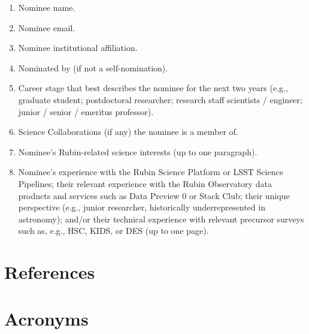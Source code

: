 \documentclass[OPS,toc]{lsstdoc}
\begin{document}
\begin{enumerate}
\item Nominee name.
\item Nominee email.
\item Nominee institutional affiliation.
\item Nominated by (if not a self-nomination).
\item Career stage that best describes the nominee for the next two years (e.g., graduate student; postdoctoral researcher; research staff scientists / engineer; junior / senior / emeritus professor).
\item Science Collaborations (if any) the nominee is a member of.
\item Nominee’s Rubin-related science interests (up to one paragraph).
\item Nominee’s experience with the Rubin Science Platform or LSST Science Pipelines; their relevant experience with the Rubin Observatory data products and services such as Data Preview 0 or Stack Club; their unique perspective (e.g., junior researcher, historically underrepresented in astronomy); and/or their technical experience with relevant precursor surveys such as, e.g., HSC, KIDS, or DES (up to one page).
\end{enumerate}

\clearpage

\section{References} \label{sec:bib}
\renewcommand{\refname}{} %


\section{Acronyms} \label{sec:acronyms}

\end{document}
